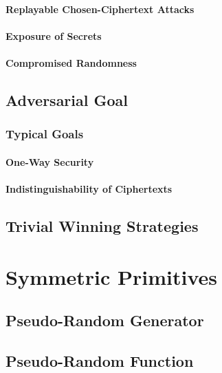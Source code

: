 \documentclass[a4paper,orivec]{llncs}
\begin{document}
\paragraph{Replayable Chosen-Ciphertext Attacks}

\paragraph{Exposure of Secrets}

\paragraph{Compromised Randomness}

\subsection{Adversarial Goal}

\subsubsection{Typical Goals}

\paragraph{One-Way Security}

\paragraph{Indistinguishability of Ciphertexts}

\subsection{Trivial Winning Strategies}


\section{Symmetric Primitives}


\subsection{Pseudo-Random Generator}


\subsection{Pseudo-Random Function}
\end{document}
